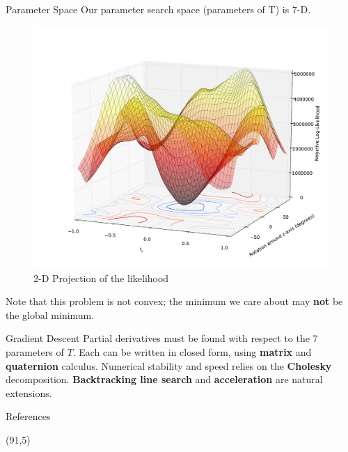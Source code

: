 \documentclass[final]{beamer}
\begin{document}
\begin{frame}{}
\begin{textblock}{27}
\begin{block}{Parameter Space}
Our parameter search space (parameters of T) is 7-D.
\vspace{-.1in}
\begin{figure}
\includegraphics[width=10in]{LLmap3.pdf}
\caption{2-D Projection of the likelihood}
\end{figure}
Note that this problem is not convex; the minimum we care about may {\bf not} be the global minimum. 
\end{block}

\begin{block}{Gradient Descent}
Partial derivatives must be found with respect to the 7 parameters of $T$. Each can be written in closed form,
using {\bf matrix} and {\bf quaternion} calculus. Numerical stability and speed relies on the {\bf Cholesky} decomposition. {\bf Backtracking line search} and {\bf acceleration} are natural extensions.
\end{block}


\begin{block}{References}
{
\footnotesize


}
\end{block}


\end{textblock}
\begin{textblock}{27}(91,5)


\end{textblock}
\end{frame}
\end{document}
